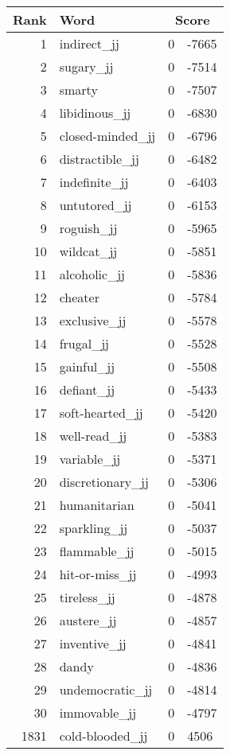 \begin{longtable}[!htbp]{| rlr@{.}l |}
    \hline
    \textbf{Rank} & \textbf{Word} & \multicolumn{2}{c|}{\textbf{Score}} \\
    \hline
    \endhead
    1 & indirect\_jj & 0 & -7665 \\
    2 & sugary\_jj & 0 & -7514 \\
    3 & smarty & 0 & -7507 \\
    4 & libidinous\_jj & 0 & -6830 \\
    5 & closed-minded\_jj & 0 & -6796 \\
    6 & distractible\_jj & 0 & -6482 \\
    7 & indefinite\_jj & 0 & -6403 \\
    8 & untutored\_jj & 0 & -6153 \\
    9 & roguish\_jj & 0 & -5965 \\
    10 & wildcat\_jj & 0 & -5851 \\
    11 & alcoholic\_jj & 0 & -5836 \\
    12 & cheater & 0 & -5784 \\
    13 & exclusive\_jj & 0 & -5578 \\
    14 & frugal\_jj & 0 & -5528 \\
    15 & gainful\_jj & 0 & -5508 \\
    16 & defiant\_jj & 0 & -5433 \\
    17 & soft-hearted\_jj & 0 & -5420 \\
    18 & well-read\_jj & 0 & -5383 \\
    19 & variable\_jj & 0 & -5371 \\
    20 & discretionary\_jj & 0 & -5306 \\
    21 & humanitarian & 0 & -5041 \\
    22 & sparkling\_jj & 0 & -5037 \\
    23 & flammable\_jj & 0 & -5015 \\
    24 & hit-or-miss\_jj & 0 & -4993 \\
    25 & tireless\_jj & 0 & -4878 \\
    26 & austere\_jj & 0 & -4857 \\
    27 & inventive\_jj & 0 & -4841 \\
    28 & dandy & 0 & -4836 \\
    29 & undemocratic\_jj & 0 & -4814 \\
    30 & immovable\_jj & 0 & -4797 \\
    1831 & cold-blooded\_jj & 0 & 4506 \\

\end{longtable}
